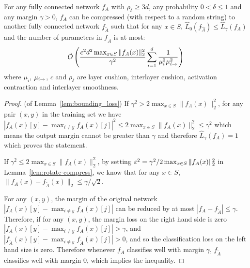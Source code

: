 \begin{lemma}\label{lem:bounding_loss}
    For any fully connected network $f_A$ with $\rho_\delta\geq 3d$, any probability $0<\delta\leq 1$ and any margin $\gamma>0$, $f_A$ can be compressed (with respect to a random string) to another fully connected network $f_{\tilde{A}}$ such that for any $x\in S$, $\hat{L}_0(f_{\hat{A}}) \leq \hat{L}_{\gamma}(f_A)$ and the number of parameters in $f_{\tilde{A}}$ is at most:
    \begin{equation*}
    \tilde{O}\left(\frac{c^2d^2\max_{x\in S}\|f_A(x)\|_2^2}{\gamma^2}\sum_{i=1}^d \frac{1}{\mu_i^2\mu_{i\rightarrow}^2}\right)
    \end{equation*}
    where $\mu_i$, $\mu_{i\rightarrow}$, $c$ and $\rho_{\delta}$ are layer cushion, interlayer cushion, activation contraction and interlayer smoothness. 
\end{lemma}
\begin{proof}(of Lemma~\ref{lem:bounding_loss})
    If $\gamma^2 > 2\max_{x\in S}\|f_A(x)\|_2^2$, for any pair $(x,y)$ in the training set we have $|f_A(x)[y]  - \max_{i\neq y} f_A(x)[j]|^2 \leq 2\max_{x\in S}\|f_A(x)\|_2^2 \leq \gamma^2$ which means the output margin cannot be greater than $\gamma$ and therefore $\hat{L}_{\gamma}(f_A)=1$ which proves the statement.
    
If $\gamma^2\leq 2\max_{x\in S}\|f_A(x)\|_2^2$, by setting $\eps^2 = \gamma^2/2\max_{x\in S}\|f_A(x)\|_2^2$ in Lemma~\ref{lem:rotate-compress}, we know that for any $x\in S$, $\|f_A(x) - f_{\tilde{A}}(x)\|_{2}\le \gamma/\sqrt{2}$.

For any $(x,y)$, the margin of the original network $|f_A(x)[y]  - \max_{i\neq y} f_A(x)[j]|$ can be reduced by at most $|f_A - f_{\tilde{A}}| \leq \gamma$. Therefore, if for any $(x,y)$, the margin loss on the right hand side is zero $|f_A(x)[y]  - \max_{i\neq y} f_A(x)[j]| > \gamma $, and $|f_{\tilde{A}}(x)[y]  - \max_{i\neq y} f_{\tilde{A}}(x)[j]| > 0$, and so the classification loss on the left hand size is zero. Therefore whenever $f_A$ classifies well with margin $\gamma$, $f_{\tilde{A}}$ classifies well with margin $0$, which implies the inequality.

\end{proof}

